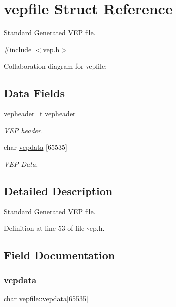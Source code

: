 \hypertarget{a00250}{}\section{vepfile Struct Reference}
\label{a00250}


Standard Generated V\+EP file.  




{\ttfamily \#include $<$vep.\+h$>$}



Collaboration diagram for vepfile\+:
\subsection*{Data Fields}
\begin{DoxyCompactItemize}
\item 
\hyperlink{a00158_a78392c340e1fe1be344df81d1438b74f_a78392c340e1fe1be344df81d1438b74f}{vepheader\+\_\+t} \hyperlink{a00250_a0fa3b39f1e4974d4ed258db1d4b22402_a0fa3b39f1e4974d4ed258db1d4b22402}{vepheader}
\begin{DoxyCompactList}\small\item\em V\+EP header. \end{DoxyCompactList}\item 
char \hyperlink{a00250_a6a40903035403710bf43295c34e883e7_a6a40903035403710bf43295c34e883e7}{vepdata} \mbox{[}65535\mbox{]}
\begin{DoxyCompactList}\small\item\em V\+EP Data. \end{DoxyCompactList}\end{DoxyCompactItemize}


\subsection{Detailed Description}
Standard Generated V\+EP file. 

Definition at line 53 of file vep.\+h.



\subsection{Field Documentation}
\mbox{\label{a00250_a6a40903035403710bf43295c34e883e7_a6a40903035403710bf43295c34e883e7}} 
\subsubsection{\texorpdfstring{vepdata}{vepdata}}
{\footnotesize\ttfamily char vepfile\+::vepdata\mbox{[}65535\mbox{]}}



